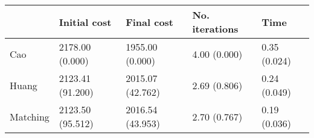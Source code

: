 \begin{tabular}{lllll}
\toprule
{} &      Initial cost &        Final cost & No. iterations &          Time \\
\midrule
Cao      &   2178.00 (0.000) &   1955.00 (0.000) &   4.00 (0.000) &  0.35 (0.024) \\
Huang    &  2123.41 (91.200) &  2015.07 (42.762) &   2.69 (0.806) &  0.24 (0.049) \\
Matching &  2123.50 (95.512) &  2016.54 (43.953) &   2.70 (0.767) &  0.19 (0.036) \\
\bottomrule
\end{tabular}
